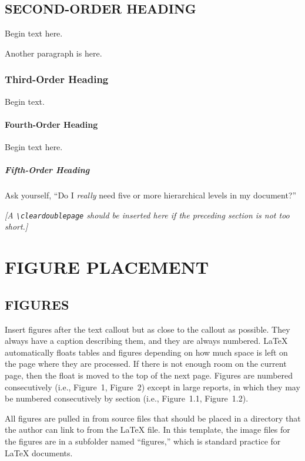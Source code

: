 \documentclass[tm]{ornltm} %
\renewcommand{\marginpar}[1]{{\small\em\color{note}[#1]}}
\begin{document}
\subsection{SECOND-ORDER HEADING}

Begin text here.

Another paragraph is here.

\subsubsection{Third-Order Heading}

Begin text.

\paragraph{Fourth-Order Heading}

Begin text here.

\subparagraph{Fifth-Order Heading}

Ask yourself, ``Do I \emph{really} need five or more hierarchical levels in my
document?''


\marginpar{A \texttt{\textbackslash cleardoublepage} should be inserted here if the preceding
section is not too short.}

\section{FIGURE PLACEMENT}
\label{sec:figures}

\subsection{FIGURES}

Insert figures after the text callout but as close to the callout as possible.
They always have a caption describing them, and they are always numbered. LaTeX
automatically floats tables and figures depending on how much space is left on
the page where they are processed. If there is not enough room on
the current page, then the float is moved to the top of the next page. Figures are
numbered consecutively (i.e., Figure~1, Figure~2) except in large reports, in
which they may be numbered consecutively by section (i.e., Figure~1.1,
Figure~1.2).

All figures are pulled in from source files that should be placed in a directory
that the author can link to from the LaTeX file.  In this template, the image
files for the figures are in a subfolder named ``figures,'' which is
standard practice for LaTeX documents.
\end{document}
